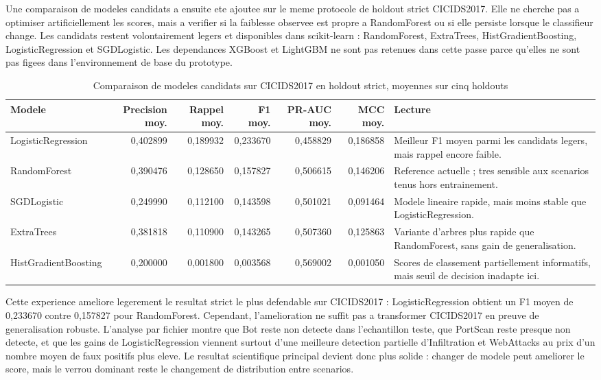 Une comparaison de modeles candidats a ensuite ete ajoutee sur le meme protocole de holdout strict CICIDS2017. Elle ne cherche pas a optimiser artificiellement les scores, mais a verifier si la faiblesse observee est propre a RandomForest ou si elle persiste lorsque le classifieur change. Les candidats restent volontairement legers et disponibles dans scikit-learn : RandomForest, ExtraTrees, HistGradientBoosting, LogisticRegression et SGDLogistic. Les dependances XGBoost et LightGBM ne sont pas retenues dans cette passe parce qu'elles ne sont pas figees dans l'environnement de base du prototype.

\begin{table}[H]
\centering
\caption{Comparaison de modeles candidats sur CICIDS2017 en holdout strict, moyennes sur cinq holdouts}
\label{tab:cicids-model-candidates}
\scriptsize
\begin{tabularx}{\textwidth}{p{3.1cm}rrrrrX}
\toprule
\textbf{Modele} & \textbf{Precision moy.} & \textbf{Rappel moy.} & \textbf{F1 moy.} & \textbf{PR-AUC moy.} & \textbf{MCC moy.} & \textbf{Lecture} \\
\midrule
LogisticRegression & 0,402899 & 0,189932 & 0,233670 & 0,458829 & 0,186858 & Meilleur F1 moyen parmi les candidats legers, mais rappel encore faible. \\
RandomForest & 0,390476 & 0,128650 & 0,157827 & 0,506615 & 0,146206 & Reference actuelle ; tres sensible aux scenarios tenus hors entrainement. \\
SGDLogistic & 0,249990 & 0,112100 & 0,143598 & 0,501021 & 0,091464 & Modele lineaire rapide, mais moins stable que LogisticRegression. \\
ExtraTrees & 0,381818 & 0,110900 & 0,143265 & 0,507360 & 0,125863 & Variante d'arbres plus rapide que RandomForest, sans gain de generalisation. \\
HistGradientBoosting & 0,200000 & 0,001800 & 0,003568 & 0,569002 & 0,001050 & Scores de classement partiellement informatifs, mais seuil de decision inadapte ici. \\
\bottomrule
\end{tabularx}
\end{table}

Cette experience ameliore legerement le resultat strict le plus defendable sur CICIDS2017 : LogisticRegression obtient un F1 moyen de 0,233670 contre 0,157827 pour RandomForest. Cependant, l'amelioration ne suffit pas a transformer CICIDS2017 en preuve de generalisation robuste. L'analyse par fichier montre que Bot reste non detecte dans l'echantillon teste, que PortScan reste presque non detecte, et que les gains de LogisticRegression viennent surtout d'une meilleure detection partielle d'Infiltration et WebAttacks au prix d'un nombre moyen de faux positifs plus eleve. Le resultat scientifique principal devient donc plus solide : changer de modele peut ameliorer le score, mais le verrou dominant reste le changement de distribution entre scenarios.

